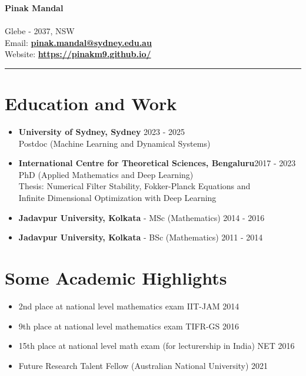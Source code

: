 \documentclass[a4paper, 11pt]{article}
\begin{document}
\noindent
\begin{minipage}{0.75\textwidth}
    \textbf{\huge Pinak Mandal} \\
    \vspace{5pt} \\
    Glebe - 2037, NSW \\
    Email: \textbf{\href{mailto:pinak.mandal@sydney.edu.au}{\color{linkblue}pinak.mandal@sydney.edu.au}} \\
    Website: \textbf{\href{https://pinakm9.github.io/}{\color{linkblue}https://pinakm9.github.io/}}
\end{minipage}%
\begin{minipage}{0.24\textwidth}
\end{minipage}

\noindent\rule{\textwidth}{3pt} %

\section*{Education and Work}
\begin{itemize}
    \item \textbf{University of Sydney, Sydney}   \hfill 2023 - 2025\\
    Postdoc (Machine Learning and Dynamical Systems)
    \item \textbf{International Centre for Theoretical Sciences, Bengaluru}\hfill 2017 - 2023 \\ PhD (Applied Mathematics and Deep Learning) \\
    Thesis: Numerical Filter Stability, Fokker-Planck Equations and \\Infinite Dimensional Optimization with Deep Learning
    \item \textbf{Jadavpur University, Kolkata} - MSc (Mathematics) \hfill 2014 - 2016
    \item \textbf{Jadavpur University, Kolkata} - BSc (Mathematics) \hfill 2011 - 2014
\end{itemize}


\section*{Some Academic Highlights}

\begin{itemize}
    \item 2nd place at national level mathematics exam IIT-JAM \hfill 2014
    \item 9th place at national level mathematics exam TIFR-GS \hfill 2016
    \item 15th place at national level math exam (for lecturership in India) NET \hfill 2016
    \item Future Research Talent Fellow (Australian National University) \hfill 2021
\end{itemize}
\end{document}
